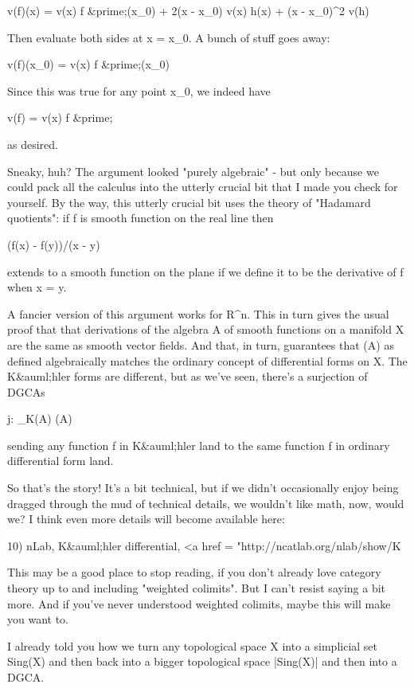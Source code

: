 v(f)(x) = v(x) f &prime;(x_{0}) + 2(x - x_{0}) v(x) h(x) + (x - x_{0})^{2} v(h)  

Then evaluate both sides at x = x_{0}.  A bunch of stuff goes away:

v(f)(x_{0}) = v(x) f &prime;(x_{0})

Since this was true for any point x_{0}, we indeed have

v(f) = v(x) f &prime;

as desired.  

Sneaky, huh?  The argument looked "purely algebraic" - but only
because we could pack all the calculus into the utterly crucial
bit that I made you check for yourself.  By the way, this utterly
crucial bit uses the theory of "Hadamard quotients": if f is 
smooth function on the real line then

(f(x) - f(y))/(x - y)

extends to a smooth function on the plane if we define it to be
the derivative of f when x = y.

A fancier version of this argument works for R^{n}.  This in
turn gives the usual proof that that derivations of the algebra A of
smooth functions on a manifold X are the same as smooth vector fields.
And that, in turn, guarantees that \Omega (A) as defined algebraically
matches the ordinary concept of differential forms on X.  The
K&auml;hler forms are different, but as we've seen, there's a
surjection of DGCAs

j: \Omega _{K}(A) \to  \Omega (A)

sending any function f in K&auml;hler land to the same function f in
ordinary differential form land.  

So that's the story!  It's a bit technical, but if we didn't 
occasionally enjoy being dragged through the mud of technical details,
we wouldn't like math, now, would we?  I think even more details will become 
available here:

10) nLab, K&auml;hler differential,
<a href = "http://ncatlab.org/nlab/show/K%

This may be a good place to stop reading, if you don't already love
category theory up to and including "weighted colimits".  But I can't
resist saying a bit more.  And if you've never understood weighted
colimits, maybe this will make you want to.

I already told you how we turn any topological space X into a
simplicial set Sing(X) and then back into a bigger topological space
|Sing(X)| and then into a DGCA.


